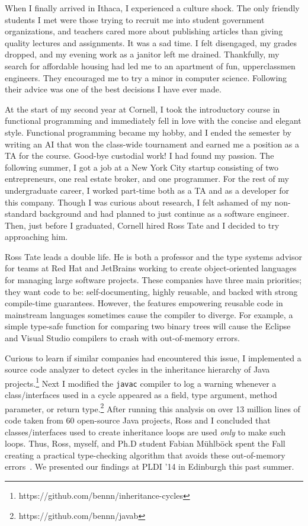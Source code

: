 \documentclass[12pt]{article}
\newcommand{\hdr}[2]{\vspace{-0.4cm}{\flushleft{\hrulefill\\\textbf{#1}\hfill{#2}\\\vspace{-0.2cm}\hrulefill}}\vspace{0.1cm}}
\begin{document}
When I finally arrived in Ithaca, I experienced a culture shock.
The only friendly students I met were those trying to recruit me into student government organizations, and teachers cared more about publishing articles than giving quality lectures and assignments.
It was a sad time.
I felt disengaged, my grades dropped, and my evening work as a janitor left me drained.
Thankfully, my search for affordable housing had led me to an apartment of fun, upperclassmen engineers.
They encouraged me to try a minor in computer science.
Following their advice was one of the best decisions I have ever made.

At the start of my second year at Cornell, I took the introductory course in functional programming and immediately fell in love with the concise and elegant style.
Functional programming became my hobby, and I ended the semester by writing an AI that won the class-wide tournament and earned me a position as a TA for the course.
Good-bye custodial work!
I had found my passion.
The following summer, I got a job at a New York City startup consisting of two entrepreneurs, one real estate broker, and one programmer.
For the rest of my undergraduate career, I worked part-time both as a TA and as a developer for this company.
Though I was curious about research, I felt ashamed of my non-standard background and had planned to just continue as a software engineer.
Then, just before I graduated, Cornell hired Ross Tate and I decided to try approaching him.

\hdr{Decidable Subtyping for Object-Oriented Languages}{Summer~\textendash~Fall 2013}

Ross Tate leads a double life.
He is both a professor and the type systems advisor for teams at Red Hat and JetBrains working to create object-oriented languages for managing large software projects.
These companies have three main priorities; they want code to be: self-documenting, highly reusable, and backed with strong compile-time guarantees.
However, the features empowering reusable code in mainstream languages sometimes cause the compiler to diverge.
For example, a simple type-safe function for comparing two binary trees will cause the Eclipse and Visual Studio compilers to crash with out-of-memory errors.

Curious to learn if similar companies had encountered this issue, I implemented a source code analyzer to detect cycles in the inheritance hierarchy of Java projects.\footnote{https://github.com/bennn/inheritance-cycles}
Next I modified the \texttt{javac} compiler to log a warning whenever a class/interfaces used in a cycle appeared as a field, type argument, method parameter, or return type.\footnote{https://github.com/bennn/javab}
After running this analysis on over 13 million lines of code taken from 60 open-source Java projects, Ross and I concluded that classes/interfaces used to create inheritance loops are used \emph{only} to make such loops.
Thus, Ross, myself, and Ph.D student Fabian M\"uhlb\"ock spent the Fall creating a practical type-checking algorithm that avoids these out-of-memory errors~\cite{shapes}.
We presented our findings at PLDI '14 in Edinburgh this past summer.
\end{document}
